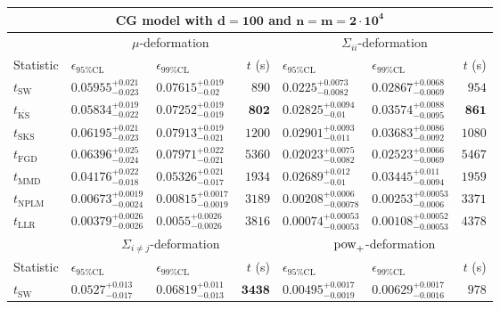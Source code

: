 \begin{tabular}{l|llr|llr}
	\toprule
	\multicolumn{7}{c}{{\bf CG model with $\mathbf{d=100}$ and $\mathbf{n=m=2\cdot 10^{4}}$}} \\
	\toprule
	\multicolumn{1}{c}{} & \multicolumn{3}{c}{$\mu$-deformation} & \multicolumn{3}{c}{$\Sigma_{ii}$-deformation} \\
	Statistic & $\epsilon_{95\%\mathrm{CL}}$ & $\epsilon_{99\%\mathrm{CL}}$ & $t$ (s) & $\epsilon_{95\%\mathrm{CL}}$ & $\epsilon_{99\%\mathrm{CL}}$ & $t$ (s) \\
	\midrule
	$t_{\mathrm{SW}}$ & $0.05955_{-0.023}^{+0.021}$ & $0.07615_{-0.02}^{+0.019}$ & $890$ & $0.0225_{-0.0082}^{+0.0073}$ & $0.02867_{-0.0069}^{+0.0068}$ & $954$ \\
	$t_{\overline{\mathrm{KS}}}$ & $0.05834_{-0.022}^{+0.019}$ & $0.07252_{-0.019}^{+0.019}$ & ${\mathbf{802}}$ & $0.02825_{-0.01}^{+0.0094}$ & $0.03574_{-0.0095}^{+0.0088}$ & ${\mathbf{861}}$ \\
	$t_{\mathrm{SKS}}$ & $0.06195_{-0.023}^{+0.021}$ & $0.07913_{-0.021}^{+0.019}$ & $1200$ & $0.02901_{-0.011}^{+0.0093}$ & $0.03683_{-0.0092}^{+0.0086}$ & $1080$ \\
	$t_{\mathrm{FGD}}$ & $0.06396_{-0.024}^{+0.025}$ & $0.07971_{-0.021}^{+0.022}$ & $5360$ & ${\mathbf{0.02023_{-0.0082}^{+0.0075}}}$ & ${\mathbf{0.02523_{-0.0069}^{+0.0066}}}$ & $5467$ \\
	$t_{\mathrm{MMD}}$ & ${\mathbf{0.04176_{-0.018}^{+0.022}}}$ & ${\mathbf{0.05326_{-0.017}^{+0.021}}}$ & $1934$ & $0.02689_{-0.01}^{+0.012}$ & $0.03445_{-0.0094}^{+0.011}$ & $1959$ \\
\rowcolor{red!35}	$t_{\mathrm{NPLM}}$ & $0.00673_{-0.0024}^{+0.0019}$ & $0.00815_{-0.0019}^{+0.0017}$ & $3189$ & $0.00208_{-0.00078}^{+0.0006}$ & $0.00253_{-0.0006}^{+0.00053}$ & $3371$ \\
	$t_{\mathrm{LLR}}$ & $0.00379_{-0.0026}^{+0.0026}$ & $0.0055_{-0.0026}^{+0.0026}$ & $3816$ & $0.00074_{-0.00053}^{+0.00053}$ & $0.00108_{-0.00053}^{+0.00052}$ & $4378$ \\
	\toprule
	\multicolumn{1}{c}{} & \multicolumn{3}{c}{$\Sigma_{i\neq j}$-deformation} & \multicolumn{3}{c}{$\rm{pow}_{+}$-deformation} \\
	Statistic & $\epsilon_{95\%\mathrm{CL}}$ & $\epsilon_{99\%\mathrm{CL}}$ & $t$ (s) & $\epsilon_{95\%\mathrm{CL}}$ & $\epsilon_{99\%\mathrm{CL}}$ & $t$ (s) \\
	\midrule
	$t_{\mathrm{SW}}$ & $0.0527_{-0.017}^{+0.013}$ & $0.06819_{-0.013}^{+0.011}$ & ${\mathbf{3438}}$ & $0.00495_{-0.0019}^{+0.0017}$ & $0.00629_{-0.0016}^{+0.0017}$ & $978$ \\

\end{tabular}
